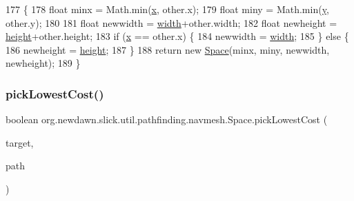 \begin{DoxyCode}
177                                     \{
178         \textcolor{keywordtype}{float} minx = Math.min(\mbox{\hyperlink{classorg_1_1newdawn_1_1slick_1_1util_1_1pathfinding_1_1navmesh_1_1_space_a314d8d0ed7351fbaaa0a191464e26bfc}{x}}, other.x);
179         \textcolor{keywordtype}{float} miny = Math.min(\mbox{\hyperlink{classorg_1_1newdawn_1_1slick_1_1util_1_1pathfinding_1_1navmesh_1_1_space_ad394b749482835dc1430efff0321010e}{y}}, other.y);
180         
181         \textcolor{keywordtype}{float} newwidth = \mbox{\hyperlink{classorg_1_1newdawn_1_1slick_1_1util_1_1pathfinding_1_1navmesh_1_1_space_a503d0a0778ebcb12877f5c432aa97698}{width}}+other.width;
182         \textcolor{keywordtype}{float} newheight = \mbox{\hyperlink{classorg_1_1newdawn_1_1slick_1_1util_1_1pathfinding_1_1navmesh_1_1_space_a2214b5226eed20766ff61fc3f9803a58}{height}}+other.height;
183         \textcolor{keywordflow}{if} (\mbox{\hyperlink{classorg_1_1newdawn_1_1slick_1_1util_1_1pathfinding_1_1navmesh_1_1_space_a314d8d0ed7351fbaaa0a191464e26bfc}{x}} == other.x) \{
184             newwidth = \mbox{\hyperlink{classorg_1_1newdawn_1_1slick_1_1util_1_1pathfinding_1_1navmesh_1_1_space_a503d0a0778ebcb12877f5c432aa97698}{width}};
185         \} \textcolor{keywordflow}{else} \{
186             newheight = \mbox{\hyperlink{classorg_1_1newdawn_1_1slick_1_1util_1_1pathfinding_1_1navmesh_1_1_space_a2214b5226eed20766ff61fc3f9803a58}{height}};
187         \}
188         \textcolor{keywordflow}{return} \textcolor{keyword}{new} \mbox{\hyperlink{classorg_1_1newdawn_1_1slick_1_1util_1_1pathfinding_1_1navmesh_1_1_space_a4409fe768c2d9ea93b971dbad3e728d1}{Space}}(minx, miny, newwidth, newheight);
189     \}
\end{DoxyCode}
\mbox{\label{classorg_1_1newdawn_1_1slick_1_1util_1_1pathfinding_1_1navmesh_1_1_space_a6a453662f1c615289882ec2c3b52f1b4}} 
\subsubsection{\texorpdfstring{pick\+Lowest\+Cost()}{pickLowestCost()}}
{\footnotesize\ttfamily boolean org.\+newdawn.\+slick.\+util.\+pathfinding.\+navmesh.\+Space.\+pick\+Lowest\+Cost (\begin{DoxyParamCaption}\item[{\mbox{\hyperlink{classorg_1_1newdawn_1_1slick_1_1util_1_1pathfinding_1_1navmesh_1_1_space}{Space}}}]{target,  }\item[{\mbox{\hyperlink{classorg_1_1newdawn_1_1slick_1_1util_1_1pathfinding_1_1navmesh_1_1_nav_path}{Nav\+Path}}}]{path }\end{DoxyParamCaption})\hspace{0.3cm}{\ttfamily [inline]}}

